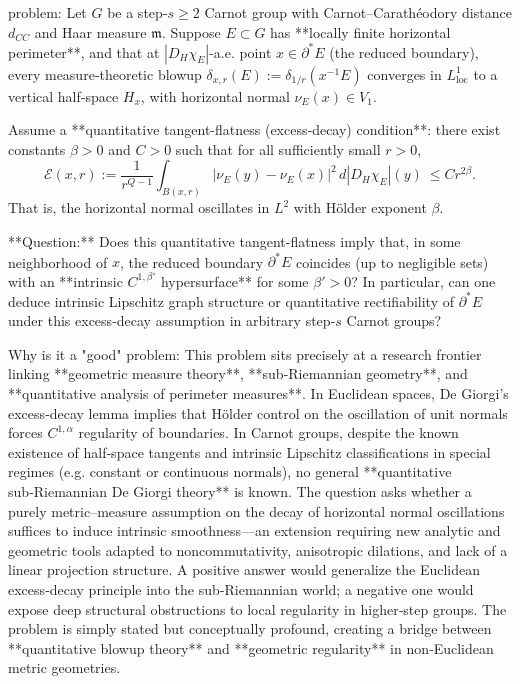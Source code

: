 problem:  
Let \(G\) be a step‑\(s\ge2\) Carnot group with Carnot–Carathéodory distance \(d_{CC}\) and Haar measure \(\mathfrak m\). Suppose \(E\subset G\) has **locally finite horizontal perimeter**, and that at \(|D_H\chi_E|\)-a.e. point \(x\in\partial^*E\) (the reduced boundary), every measure‑theoretic blowup \(\delta_{x,r}(E):=\delta_{1/r}(x^{-1}E)\) converges in \(L^1_{\mathrm{loc}}\) to a vertical half‑space \(H_x\), with horizontal normal \(\nu_E(x)\in V_1\).

Assume a **quantitative tangent-flatness (excess‑decay) condition**: there exist constants \(\beta>0\) and \(C>0\) such that for all sufficiently small \(r>0\),
\[
\mathcal E(x,r) := \frac{1}{r^{Q-1}} \int_{B(x,r)} 
|\nu_E(y) - \nu_E(x)|^2 \, d|D_H\chi_E|(y)
\ \le C r^{2\beta}.
\]
That is, the horizontal normal oscillates in \(L^2\) with Hölder exponent \(\beta\).

**Question:**  
Does this quantitative tangent-flatness imply that, in some neighborhood of \(x\), the reduced boundary \(\partial^*E\) coincides (up to negligible sets) with an **intrinsic \(C^{1,\beta'}\) hypersurface** for some \(\beta'>0\)?  
In particular, can one deduce intrinsic Lipschitz graph structure or quantitative rectifiability of \(\partial^*E\) under this excess‑decay assumption in arbitrary step‑\(s\) Carnot groups?

Why is it a "good" problem:  
This problem sits precisely at a research frontier linking **geometric measure theory**, **sub‑Riemannian geometry**, and **quantitative analysis of perimeter measures**. In Euclidean spaces, De Giorgi’s excess‑decay lemma implies that Hölder control on the oscillation of unit normals forces \(C^{1,\alpha}\) regularity of boundaries. In Carnot groups, despite the known existence of half‑space tangents and intrinsic Lipschitz classifications in special regimes (e.g. constant or continuous normals), no general **quantitative sub‑Riemannian De Giorgi theory** is known.  
The question asks whether a purely metric–measure assumption on the decay of horizontal normal oscillations suffices to induce intrinsic smoothness—an extension requiring new analytic and geometric tools adapted to noncommutativity, anisotropic dilations, and lack of a linear projection structure.  
A positive answer would generalize the Euclidean excess‑decay principle into the sub‑Riemannian world; a negative one would expose deep structural obstructions to local regularity in higher‑step groups. The problem is simply stated but conceptually profound, creating a bridge between **quantitative blowup theory** and **geometric regularity** in non‑Euclidean metric geometries.